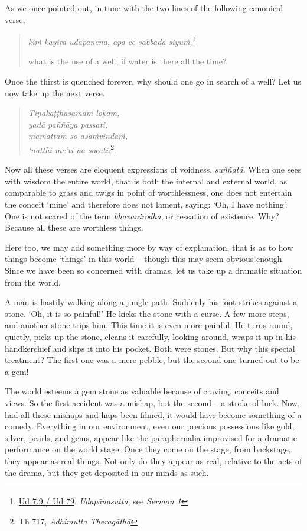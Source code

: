 As we once pointed out, in tune with the two lines of the following canonical verse,

\begin{quote}
\emph{kiṁ kayirā udapānena, āpā ce sabbadā siyuṁ,}\footnote{\href{https://suttacentral.net/ud7.9/pli/ms}{Ud 7.9 / Ud 79}, \emph{Udapānasutta}; see \emph{Sermon 1}}

what is the use of a well, if water is there all the time?
\end{quote}

Once the thirst is quenched forever, why should one go in search of a well? Let us now take up the next verse.

\begin{quote}
\emph{Tiṇakaṭṭhasamaṁ lokaṁ,}\\
\emph{yadā paññāya passati,}\\
\emph{mamattaṁ so asaṁvindaṁ,}\\
\emph{`natthi me'ti na socati.}\footnote{Th 717, \emph{Adhimutta Theragāthā}}
\end{quote}

Now all these verses are eloquent expressions of voidness, \emph{suññatā}. When one sees with wisdom the entire world, that is both the internal and external world, as comparable to grass and twigs in point of worthlessness, one does not entertain the conceit `mine' and therefore does not lament, saying: `Oh, I have nothing'. One is not scared of the term \emph{bhavanirodha}, or cessation of existence. Why? Because all these are worthless things.

Here too, we may add something more by way of explanation, that is as to how things become `things' in this world -- though this may seem obvious enough. Since we have been so concerned with dramas, let us take up a dramatic situation from the world.

A man is hastily walking along a jungle path. Suddenly his foot strikes against a stone. `Oh, it is so painful!' He kicks the stone with a curse. A few more steps, and another stone trips him. This time it is even more painful. He turns round, quietly, picks up the stone, cleans it carefully, looking around, wraps it up in his handkerchief and slips it into his pocket. Both were stones. But why this special treatment? The first one was a mere pebble, but the second one turned out to be a gem!

The world esteems a gem stone as valuable because of craving, conceits and views. So the first accident was a mishap, but the second -- a stroke of luck. Now, had all these mishaps and haps been filmed, it would have become something of a comedy. Everything in our environment, even our precious possessions like gold, silver, pearls, and gems, appear like the paraphernalia improvised for a dramatic performance on the world stage. Once they come on the stage, from backstage, they appear as real things. Not only do they appear as real, relative to the acts of the drama, but they get deposited in our minds as such.

